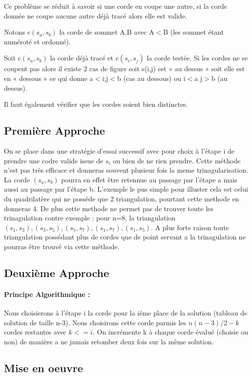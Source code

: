\documentclass[a4paper,10pt]{article}
\begin{document}
Ce problème se réduit à savoir si une corde en coupe une autre, si la corde donnée ne coupe aucune autre déjà tracé alors elle est valide.

Notons c$(s_a,s_b)$ la corde de sommet A,B avec A$<$B (les sommet étant numéroté et ordonné).

Soit c$(s_a,s_b)$ la corde déjà tracé et c$(s_i,s_j)$ la corde testée.
Si les cordes ne se coupent pas alors il existe 2 cas de figure soit s(i,j) est « au dessus » soit elle est en « dessous » ce qui donne a$<$i;j$<$b (cas au dessous) ou i$<$a j$>$b (au dessus).

Il faut également vérifier que les cordes soient bien distinctes.
 
\subsection{Première Approche}
 

On se place dans une stratégie d'essai successif avec pour choix à l'étape i de prendre une codre valide issue de $s_i$ ou bien de ne rien prendre. 
Cette méthode n'est pas très efficace et donneras souvent plusieur fois la meme trinagularisation. La corde $(s_a,s_b)$ pourra en effet être retennue au passage par l'étape a mais aussi au passage par l'étape b. 
L'exemple le pus simple pour illuster cela est celui du quadrilatère qui ne possède que 2 triangulation, pourtant cette methode en donneras 4.
De plus cette methode ne permet pas de trouver toute les trinagulation contre exemple :
pour n=8, la triangulation $(s_1,s_3),(s_3,s_5),(s_5,s_7),(s_1,s_7),(s_1,s_5)$.
A plus forte raison toute triangulation possédant plus de cordes que de point servant a la trinagulation ne pourras être trouvé via cette méthode.

\subsection{Deuxième Approche} 
\paragraph{Principe Algorithmique :} 
Nous choisierons à l'étape i la corde pour la iéme place de la solution (tableau de solution de taille n-3).
Nous choisirons cette corde parmis les $n(n-3)/2 - k$ cordes restantes avec $k<=i$.
On incrémente k à chaque corde évalué (choisie ou non) de manière a ne jamais retomber deux fois sur la même solution.

\subsection{Mise en oeuvre}
\end{document}

